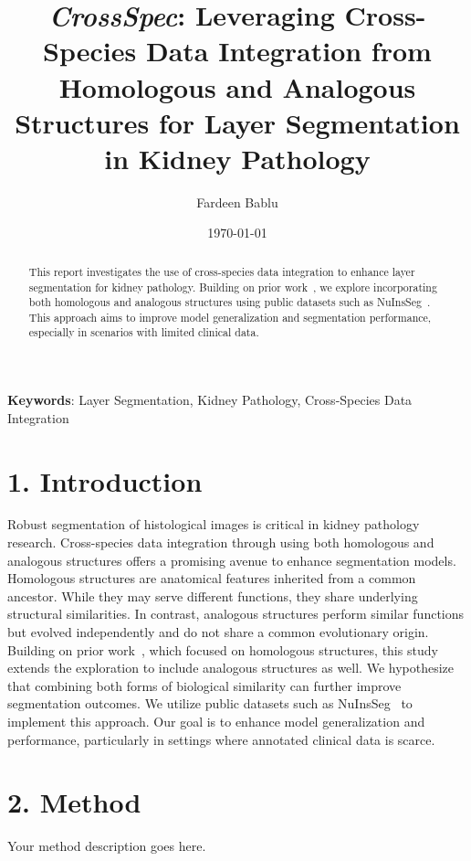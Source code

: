 \documentclass[11pt]{article}
\title{\bfseries\Large \textit{CrossSpec}: Leveraging Cross-Species Data Integration from Homologous and Analogous Structures for Layer Segmentation in Kidney Pathology}
\author[1]{Fardeen Bablu}
\affil[1]{Department of Computer Science, Vanderbilt University, Nashville, TN, USA \\ \texttt{fardeen.bablu@vanderbilt.edu}}
\date{\today}
\begin{document}
\maketitle

\begin{abstract}
\noindent
This report investigates the use of cross-species data integration to enhance layer segmentation for kidney pathology. Building on prior work~\cite{zhu2025crossspeciesdataintegrationenhanced}, we explore incorporating both homologous and analogous structures using public datasets such as NuInsSeg~\cite{mahbod2023nuinsseg}. This approach aims to improve model generalization and segmentation performance, especially in scenarios with limited clinical data.
\end{abstract}

\textbf{Keywords}: Layer Segmentation, Kidney Pathology, Cross-Species Data Integration

\section*{1. Introduction}
\noindent
Robust segmentation of histological images is critical in kidney pathology research. Cross-species data integration through using both homologous and analogous structures offers a promising avenue to enhance segmentation models. Homologous structures are anatomical features inherited from a common ancestor. While they may serve different functions, they share underlying structural similarities. In contrast, analogous structures perform similar functions but evolved independently and do not share a common evolutionary origin. Building on prior work~\cite{zhu2025crossspeciesdataintegrationenhanced}, which focused on homologous structures, this study extends the exploration to include analogous structures as well. We hypothesize that combining both forms of biological similarity can further improve segmentation outcomes. We utilize public datasets such as NuInsSeg~\cite{mahbod2023nuinsseg} to implement this approach. Our goal is to enhance model generalization and performance, particularly in settings where annotated clinical data is scarce.

\section*{2. Method}
\noindent
Your method description goes here.



\end{document}
